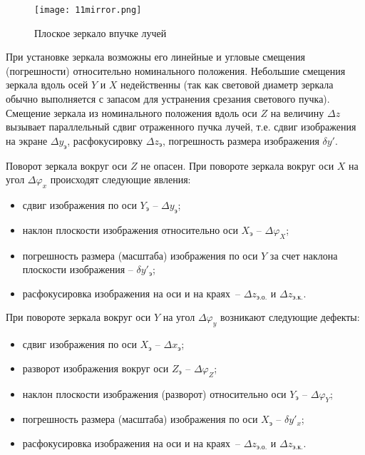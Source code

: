 \begin{figure}[h!]
	\caption{ Плоское зеркало в пучке лучей }
	\texttt{[image: 11mirror.png]}
	\label{pic:11mirror}
\end{figure}

При установке зеркала возможны его линейные и угловые смещения (погрешности) относительно номинального положения. Небольшие смещения зеркала вдоль осей $ Y $ и $ X $ недейственны (так как световой диаметр зеркала обычно выполняется с запасом для устранения срезания светового пучка). Смещение зеркала из номинального положения вдоль оси $ Z $ на величину $ \Delta z $ вызывает параллельный сдвиг отраженного пучка лучей, т.е. сдвиг изображения на экране $ \Delta y_\text{э} $, расфокусировку $ \Delta z_\text{э} $, погрешность размера изображения $ \delta y' $.

Поворот зеркала вокруг оси $ Z $ не опасен. При повороте зеркала вокруг оси $ X $ на угол $ \Delta \varphi_x $ происходят следующие явления:
\begin{itemize}
\item сдвиг изображения по оси $ Y_\text{э} $ -- $ \Delta y_\text{э} $;
\item наклон плоскости изображения относительно оси $ X_\text{э} $ -- $ \Delta \varphi_X $;
\item погрешность размера (масштаба) изображения по оси $ Y $ за счет наклона плоскости изображения -- $ \delta y'_\text{э} $;
\item расфокусировка изображения на оси и на краях~-- $ \Delta z_\text{э.о.} $ и $ \Delta z_\text{э.к.} $.
\end{itemize}

При повороте зеркала вокруг оси $ Y $ на угол $ \Delta \varphi_y $ возникают следующие дефекты:
\begin{itemize}
\item сдвиг изображения по оси $ X_\text{э} $ -- $ \Delta x_\text{э} $;
\item разворот изображения вокруг оси $ Z_\text{э} $ -- $ \Delta \varphi_{Z} $;
\item наклон плоскости изображения (разворот) относительно оси  $ Y_\text{э} $ -- $ \Delta \varphi_Y $;
\item погрешность размера (масштаба) изображения по оси $ X_\text{э} $ -- $ \delta y'_x $;
\item расфокусировка изображения на оси и на краях~-- $ \Delta z_\text{э.о.} $ и $ \Delta z_\text{э.к.} $.
\end{itemize}

